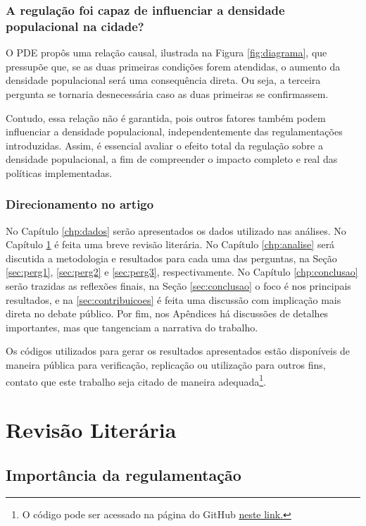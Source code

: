 \subsection*{A regulação foi capaz de influenciar a densidade populacional na cidade?} 

O PDE propôs uma relação causal, ilustrada na Figura \ref{fig:diagrama}, que pressupõe que, se as duas primeiras condições forem atendidas, o aumento da densidade populacional será uma consequência direta. Ou seja, a terceira pergunta se tornaria desnecessária caso as duas primeiras se confirmassem.

Contudo, essa relação não é garantida, pois outros fatores também podem influenciar a densidade populacional, independentemente das regulamentações introduzidas. Assim, é essencial avaliar o efeito total da regulação sobre a densidade populacional, a fim de compreender o impacto completo e real das políticas implementadas.

\subsection*{Direcionamento no artigo}

No Capítulo \ref{chp:dados} serão apresentados os dados utilizado nas análises. No Capítulo \ref{chp:revisao} é feita uma breve revisão literária. No Capítulo \ref{chp:analise} será discutida a metodologia e resultados para cada uma das perguntas, na Seção \ref{sec:perg1}, \ref{sec:perg2} e \ref{sec:perg3}, respectivamente. No Capítulo \ref{chp:conclusao} serão trazidas as reflexões finais, na Seção \ref{sec:conclusao} o foco é nos principais resultados, e na \ref{sec:contribuicoes} é feita uma discussão com implicação mais direta no debate público. Por fim, nos Apêndices há discussões de detalhes importantes, mas que tangenciam a narrativa do trabalho.

Os códigos utilizados para gerar os resultados apresentados estão disponíveis de maneira pública para verificação, replicação ou utilização para outros fins, contato que este trabalho seja citado de maneira adequada\footnote{O código pode ser acessado na página do GitHub \href{https://github.com/gustavo-tm}{neste link.}}.


\chapter{Revisão Literária}
\label{chp:revisao}

\section{Importância da regulamentação}

